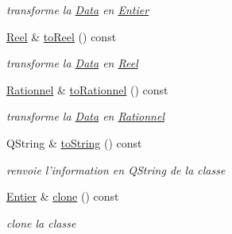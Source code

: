 \begin{DoxyCompactItemize}
\begin{DoxyCompactList}\small\item\em transforme la \hyperlink{classNombre_1_1Data}{Data} en \hyperlink{classNombre_1_1Entier}{Entier} \item\end{DoxyCompactList}\item 
\hypertarget{classNombre_1_1Entier_a1844bb6f59d844abdd10c1b9d252ae49}{
\hyperlink{classNombre_1_1Reel}{Reel} \& \hyperlink{classNombre_1_1Entier_a1844bb6f59d844abdd10c1b9d252ae49}{toReel} () const }
\label{classNombre_1_1Entier_a1844bb6f59d844abdd10c1b9d252ae49}

\begin{DoxyCompactList}\small\item\em transforme la \hyperlink{classNombre_1_1Data}{Data} en \hyperlink{classNombre_1_1Reel}{Reel} \item\end{DoxyCompactList}\item 
\hypertarget{classNombre_1_1Entier_a74bc77a7d8ea295c30c4acebf8539d32}{
\hyperlink{classNombre_1_1Rationnel}{Rationnel} \& \hyperlink{classNombre_1_1Entier_a74bc77a7d8ea295c30c4acebf8539d32}{toRationnel} () const }
\label{classNombre_1_1Entier_a74bc77a7d8ea295c30c4acebf8539d32}

\begin{DoxyCompactList}\small\item\em transforme la \hyperlink{classNombre_1_1Data}{Data} en \hyperlink{classNombre_1_1Rationnel}{Rationnel} \item\end{DoxyCompactList}\item 
\hypertarget{classNombre_1_1Entier_a2ace2d2bb563a7df910b9dc5624002b6}{
QString \& \hyperlink{classNombre_1_1Entier_a2ace2d2bb563a7df910b9dc5624002b6}{toString} () const }
\label{classNombre_1_1Entier_a2ace2d2bb563a7df910b9dc5624002b6}

\begin{DoxyCompactList}\small\item\em renvoie l'information en QString de la classe \item\end{DoxyCompactList}\item 
\hypertarget{classNombre_1_1Entier_a8ce06f07633461fa87d8b818086563f0}{
\hyperlink{classNombre_1_1Entier}{Entier} \& \hyperlink{classNombre_1_1Entier_a8ce06f07633461fa87d8b818086563f0}{clone} () const }
\label{classNombre_1_1Entier_a8ce06f07633461fa87d8b818086563f0}

\begin{DoxyCompactList}\small\item\em clone la classe \item\end{DoxyCompactList}\end{DoxyCompactItemize}
